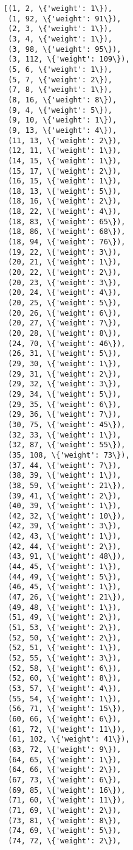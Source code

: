 \documentclass[11pt]{article}
\makeatletter
\newcommand{\boxspacing}{\kern\kvtcb@left@rule\kern\kvtcb@boxsep}
\newcommand{\prompt}[4]{
        {\ttfamily\llap{{\color{#2}[#3]:\hspace{3pt}#4}}\vspace{-\baselineskip}}
    }
\makeatother
\begin{document}
            \begin{tcolorbox}[breakable, size=fbox, boxrule=.5pt, pad at break*=1mm, opacityfill=0]
\prompt{Out}{outcolor}{13}{\boxspacing}
\begin{Verbatim}[commandchars=\\\{\}]
[(1, 2, \{'weight': 1\}),
 (1, 92, \{'weight': 91\}),
 (2, 3, \{'weight': 1\}),
 (3, 4, \{'weight': 1\}),
 (3, 98, \{'weight': 95\}),
 (3, 112, \{'weight': 109\}),
 (5, 6, \{'weight': 1\}),
 (5, 7, \{'weight': 2\}),
 (7, 8, \{'weight': 1\}),
 (8, 16, \{'weight': 8\}),
 (9, 4, \{'weight': 5\}),
 (9, 10, \{'weight': 1\}),
 (9, 13, \{'weight': 4\}),
 (11, 13, \{'weight': 2\}),
 (12, 11, \{'weight': 1\}),
 (14, 15, \{'weight': 1\}),
 (15, 17, \{'weight': 2\}),
 (16, 15, \{'weight': 1\}),
 (18, 13, \{'weight': 5\}),
 (18, 16, \{'weight': 2\}),
 (18, 22, \{'weight': 4\}),
 (18, 83, \{'weight': 65\}),
 (18, 86, \{'weight': 68\}),
 (18, 94, \{'weight': 76\}),
 (19, 22, \{'weight': 3\}),
 (20, 21, \{'weight': 1\}),
 (20, 22, \{'weight': 2\}),
 (20, 23, \{'weight': 3\}),
 (20, 24, \{'weight': 4\}),
 (20, 25, \{'weight': 5\}),
 (20, 26, \{'weight': 6\}),
 (20, 27, \{'weight': 7\}),
 (20, 28, \{'weight': 8\}),
 (24, 70, \{'weight': 46\}),
 (26, 31, \{'weight': 5\}),
 (29, 30, \{'weight': 1\}),
 (29, 31, \{'weight': 2\}),
 (29, 32, \{'weight': 3\}),
 (29, 34, \{'weight': 5\}),
 (29, 35, \{'weight': 6\}),
 (29, 36, \{'weight': 7\}),
 (30, 75, \{'weight': 45\}),
 (32, 33, \{'weight': 1\}),
 (32, 87, \{'weight': 55\}),
 (35, 108, \{'weight': 73\}),
 (37, 44, \{'weight': 7\}),
 (38, 39, \{'weight': 1\}),
 (38, 59, \{'weight': 21\}),
 (39, 41, \{'weight': 2\}),
 (40, 39, \{'weight': 1\}),
 (42, 32, \{'weight': 10\}),
 (42, 39, \{'weight': 3\}),
 (42, 43, \{'weight': 1\}),
 (42, 44, \{'weight': 2\}),
 (43, 91, \{'weight': 48\}),
 (44, 45, \{'weight': 1\}),
 (44, 49, \{'weight': 5\}),
 (46, 45, \{'weight': 1\}),
 (47, 26, \{'weight': 21\}),
 (49, 48, \{'weight': 1\}),
 (51, 49, \{'weight': 2\}),
 (51, 53, \{'weight': 2\}),
 (52, 50, \{'weight': 2\}),
 (52, 51, \{'weight': 1\}),
 (52, 55, \{'weight': 3\}),
 (52, 58, \{'weight': 6\}),
 (52, 60, \{'weight': 8\}),
 (53, 57, \{'weight': 4\}),
 (55, 54, \{'weight': 1\}),
 (56, 71, \{'weight': 15\}),
 (60, 66, \{'weight': 6\}),
 (61, 72, \{'weight': 11\}),
 (61, 102, \{'weight': 41\}),
 (63, 72, \{'weight': 9\}),
 (64, 65, \{'weight': 1\}),
 (64, 66, \{'weight': 2\}),
 (67, 73, \{'weight': 6\}),
 (69, 85, \{'weight': 16\}),
 (71, 60, \{'weight': 11\}),
 (71, 69, \{'weight': 2\}),
 (73, 81, \{'weight': 8\}),
 (74, 69, \{'weight': 5\}),
 (74, 72, \{'weight': 2\}),

\end{Verbatim}
\end{tcolorbox}
\end{document}

